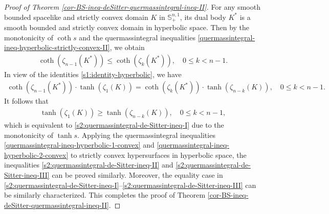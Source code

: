 \documentclass[11pt,reqno]{amsart}
\theoremstyle{definition}
\theoremstyle{remark}
\numberwithin{equation}{section}
\renewcommand{\(}{\left(}
\renewcommand{\)}{\right)}
\renewcommand{\~}{\tilde}
\renewcommand{\-}{\overline}
\begin{document}
\begin{proof}[Proof of Theorem \ref{cor-BS-ineq-deSitter-quermassintegral-ineq-II}]
    For any smooth bounded spacelike and strictly convex domain $K$ in $\mathbb S^{n,1}_{+}$, its dual body $K^\ast$ is a smooth bounded and strictly convex domain in hyperbolic space. Then by the monotonicity of $\coth s$ and the quermassintegral inequalities \eqref{quermassintegral-ineq-hyperbolic-strictly-convex-II}, we obtain 
	\begin{align*}
	\coth(\zeta_{n-1}(K^\ast)) \leq \coth(\zeta_{k}(K^\ast)), \quad 0\leq k<n-1.
	\end{align*}
	In view of the identities \eqref{s1:identity-hyperbolic}, we have
	\begin{align*}
	\coth(\zeta_{n-1}(K^\ast)) \cdot \tanh(\zeta_{1}(K))=\coth(\zeta_{k}(K^\ast)) \cdot \tanh(\zeta_{n-k}(K)), \quad 0\leq k<n-1. 
	\end{align*}
	It follows that
	\begin{align*}
	\tanh(\zeta_{1}(K)) \geq \tanh(\zeta_{n-k}(K)), \quad 0\leq k<n-1,
	\end{align*} 
	which is equivalent to \eqref{s2:quermassintegral-de-Sitter-ineq-I} due to the monotonicity of $\tanh s$. 
	Applying the quermassintegral inequalities \eqref{quermassintegral-ineq-hyperbolic-1-convex} and \eqref{quermassintegral-ineq-hyperbolic-2-convex} to strictly convex hypersurfaces in hyperbolic space, the inequalities \eqref{s2:quermassintegral-de-Sitter-ineq-II} and \eqref{s2:quermassintegral-de-Sitter-ineq-III} can be proved similarly. Moreover, the equality case in \eqref{s2:quermassintegral-de-Sitter-ineq-I}--\eqref{s2:quermassintegral-de-Sitter-ineq-III} can be similarly characterized. This completes the proof of Theorem \ref{cor-BS-ineq-deSitter-quermassintegral-ineq-II}. 	
\end{proof}
\end{document}
